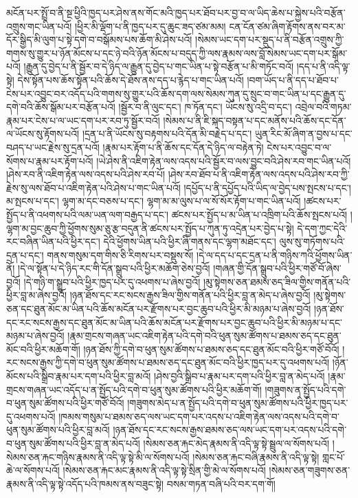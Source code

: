 མངོན་པར་སྤྲོ་བ་ནི་སྔ་ཕྱིའི་ཁྱད་པར་ཤེས་ནས་གོང་མའི་ཁྱད་པར་ཐོབ་པར་བྱ་བ་ལ་ཡིད་ཆེས་པ་སྐྱེས་པའི་བརྩོན་འགྲུས་གང་ཡིན་པའོ། །ཕྱིར་མི་ལྡོག་པ་ནི་ཁྱད་པར་དུ་ཆུང་ཟད་ཙམ་མམ། ངན་ངོན་ཙམ་ཞིག་རྟོགས་ནས་བར་མ་དོར་སྒྱིད་མི་ལུག་པ་སྟེ་དགེ་བ་བསྒོམས་པས་ཆོག་མི་ཤེས་པའོ། །སེམས་ཡང་དག་པར་སྡུད་པ་ནི་བརྩོན་འགྲུས་ཀྱི་གགས་སུ་གྱུར་པ་ཉོན་མོངས་པ་དང་ཉེ་བའི་ཉོན་མོངས་པ་བདུད་ཀྱི་ལས་རྣམས་ལས་བློ་སེམས་ཡང་དག་པར་སྒོམ་པའོ། །རྒྱུན་དུ་བྱེད་པ་ནི་སྦྱོར་བ་དེ་ཉིད་ལ་རྒྱུན་དུ་བྱེད་པ་གང་ཡིན་པ་སྟེ་བརྩོན་པ་མི་གཏོང་བའོ། །དད་པ་ནི་འདི་ལྟ་སྟེ། དེས་སྟོན་པས་ཆོས་སྟོན་པའི་ཆོས་དེ་ཐོས་ནས་དད་པ་རྙེད་པ་གང་ཡིན་པའོ། །བག་ཡོད་པ་ནི་དད་པ་ཐོབ་པ་ངེས་པར་འབྱུང་བར་འདོད་པའི་གགས་སུ་གྱུར་པའི་ཆོས་དག་ལས་སེམས་ཀུན་དུ་སྲུང་བ་གང་ཡིན་པ་དང་རྒྱུན་དུ་དགེ་བའི་ཆོས་སྒོམ་པར་བརྩོན་པའོ། །སྦྱོར་བ་ནི་ལུང་དང་། ཁ་ཏོན་དང་། ཡོངས་སུ་འདྲི་བ་དང་། འབྲེལ་བའི་གཏམ་རྣམ་པར་ངེས་པ་ལ་ཡང་དག་པར་རབ་ཏུ་སྦྱོར་བའོ། །སེམས་པ་ནི་ཇི་སྐད་བསྟན་པ་དང་མནོས་པའི་ཆོས་དང་དོན་ལ་ཡོངས་སུ་རྟོགས་པའོ། །དྲན་པ་ནི་ཡོངས་སུ་བརྟགས་པའི་དོན་མི་བརྗེད་པ་དང་། ཡུན་རིང་མོ་ཞིག་ན་བྱས་པ་དང་བཤད་པ་ཡང་རྗེས་སུ་དྲན་པའོ། །རྣམ་པར་རྟོག་པ་ནི་ཆོས་དང་དོན་དེ་ཉིད་ལ་བརྟེན་ཏེ། ངེས་པར་འབྱུང་བ་ལ་སོགས་པ་རྣམ་པར་རྟོག་པའོ། །ཡེ་ཤེས་ནི་འཇིག་རྟེན་ལས་འདས་པའི་སྦྱོར་བ་ལས་བྱུང་བའི་ཤེས་རབ་གང་ཡིན་པའོ། །ཤེས་རབ་ནི་འཇིག་རྟེན་ལས་འདས་པའི་ཤེས་རབ་པོ། །ཤེས་རབ་ཐོབ་པ་ནི་འཇིག་རྟེན་ལས་འདས་པའི་ཤེས་རབ་ཀྱི་རྗེས་སུ་ལས་ཐོབ་པ་འཇིག་རྟེན་པའི་ཤེས་པ་གང་ཡིན་པའོ། །དཔྱོད་པ་ནི་དཔྱོད་པའི་ཡིད་ལ་བྱེད་པས་སྤངས་པ་དང་། མ་སྤངས་པ་དང་། ལྷག་མ་དང་བཅས་པ་དང་། ལྷག་མ་མ་ལུས་པ་ལ་སོ་སོར་རྟོག་པ་གང་ཡིན་པའོ། །ཚངས་པར་སྤྱོད་པ་ནི་འཕགས་པའི་ལམ་ཡན་ལག་བརྒྱད་པ་དང་། ཚངས་པར་སྤྱོད་པ་མ་ཡིན་པ་འཁྲིག་པའི་ཆོས་སྤངས་པའོ། །ལྷག་མ་བྱང་ཆུབ་ཀྱི་ཕྱོགས་སུམ་ཅུ་རྩ་བདུན་ནི་ཚངས་པར་སྤྱོད་པ་ཀུན་ཏུ་འདྲེན་པར་བྱེད་པ་སྟེ། དེ་དག་ཀྱང་དེའི་རང་བཞིན་ཡིན་པའི་ཕྱིར་དང་། དེའི་ཕྱོགས་ཡིན་པའི་ཕྱིར་ཞི་གནས་དང་ལྷག་མཐོང་དང་། ལུས་སུ་གཏོགས་པའི་དྲན་པ་དང་། གནས་གསུམ་དག་གིས་ཅི་རིགས་པར་བསྡུས་སོ། །དེ་ལ་དད་པ་དང་དྲན་པ་ནི་གཉིས་ཀའི་ཕྱོགས་ཡིན་ནོ། །དེ་ལ་སྟོན་པ་དེ་ཉིད་རང་གི་དོན་སྒྲུབ་པའི་ཕྱིར་མཆོག་ཅེས་བྱའོ། །གཞན་གྱི་དོན་སྒྲུབ་པའི་ཕྱིར་གཙོ་བོ་ཞེས་བྱའོ། །དེ་གཉི་ག་སྒྲུབ་པའི་ཕྱིར་ཁྱད་པར་དུ་འཕགས་པ་ཞེས་བྱའོ། །མུ་སྟེགས་ཅན་ཐམས་ཅད་ཟིལ་གྱིས་གནོན་པའི་ཕྱིར་བླ་མ་ཞེས་བྱའོ། །ཉན་ཐོས་དང་རང་སངས་རྒྱས་ཟིལ་གྱིས་གནོན་པའི་ཕྱིར་བླ་ན་མེད་པ་ཞེས་བྱའོ། །མུ་སྟེགས་ཅན་དང་ཐུན་མོང་མ་ཡིན་པའི་ཆོས་མངོན་པར་རྫོགས་པར་བྱང་ཆུབ་པའི་ཕྱིར་མི་མཉམ་པ་ཞེས་བྱའོ། །ཉན་ཐོས་དང་རང་སངས་རྒྱས་དང་ཐུན་མོང་མ་ཡིན་པའི་ཆོས་མངོན་པར་རྫོགས་པར་བྱང་ཆུབ་པའི་ཕྱིར་མི་མཉམ་པ་དང་མཉམ་པ་ཞེས་བྱའོ། །རྣམ་གྲངས་གཞན་ཡང་འཇིག་རྟེན་པའི་དགེ་བའི་ཕུན་སུམ་ཚོགས་པ་ཐམས་ཅད་དང་ཐུན་མོང་བའི་ཕྱིར་མཆོག་གོ། །ཉན་ཐོས་ཀྱི་དགེ་བ་ཕུན་སུམ་ཚོགས་པ་ཐམས་ཅད་དང་ཐུན་མོང་བའི་ཕྱིར་གཙོ་བོའོ། །རང་སངས་རྒྱས་ཀྱི་དགེ་བ་ཕུན་སུམ་ཚོགས་པ་ཐམས་ཅད་དང་ཐུན་མོང་བའི་ཕྱིར་ཁྱད་པར་དུ་འཕགས་པའོ། །ཉོན་མོངས་པའི་སྒྲིབ་རྣམ་པར་དག་པའི་ཕྱིར་བླ་མའོ། །ཤེས་བྱའི་སྒྲིབ་པ་རྣམ་པར་དག་པའི་ཕྱིར་བླ་ན་མེད་པའོ། །རྣམ་གྲངས་གཞན་ཡང་འདོད་པ་ན་སྤྱོད་པའི་དགེ་བ་ཕུན་སུམ་ཚོགས་པའི་ཕྱིར་མཆོག་གོ། །གཟུགས་ན་སྤྱོད་པའི་དགེ་བ་ཕུན་སུམ་ཚོགས་པའི་ཕྱིར་གཙོ་བོའོ། །གཟུགས་མེད་པ་ན་སྤྱོད་པའི་དགེ་བ་ཕུན་སུམ་ཚོགས་པའི་ཕྱིར་ཁྱད་པར་དུ་འཕགས་པའོ། །ཁམས་གསུམ་པ་ཐམས་ཅད་ལས་ཡང་དག་པར་འདས་པ་འཇིག་རྟེན་ལས་འདས་པའི་དགེ་བ་ཕུན་སུམ་ཚོགས་པའི་ཕྱིར་བླ་མའོ། །ཉན་ཐོས་དང་རང་སངས་རྒྱས་ཐམས་ཅད་ལས་ཡང་དག་པར་འདས་པའི་དགེ་བ་ཕུན་སུམ་ཚོགས་པའི་ཕྱིར་བླ་ན་མེད་པའོ། །སེམས་ཅན་རྐང་མེད་རྣམས་ནི་འདི་ལྟ་སྟེ་སྦྲུལ་ལ་སོགས་པའོ། །སེམས་ཅན་རྐང་གཉིས་རྣམས་ནི་འདི་ལྟ་སྟེ་མི་ལ་སོགས་པའོ། །སེམས་ཅན་རྐང་བཞི་རྣམས་ནི་འདི་ལྟ་སྟེ། གླང་པོ་ཆེ་ལ་སོགས་པའོ། །སེམས་ཅན་རྐང་མང་རྣམས་ནི་འདི་ལྟ་སྟེ་སྲིན་གྱི་མེ་ལ་སོགས་པའོ། །སེམས་ཅན་གཟུགས་ཅན་རྣམས་ནི་འདི་ལྟ་སྟེ་འདོད་པའི་ཁམས་ནས་བཟུང་སྟེ། བསམ་གཏན་བཞི་པའི་བར་དག་གོ། 